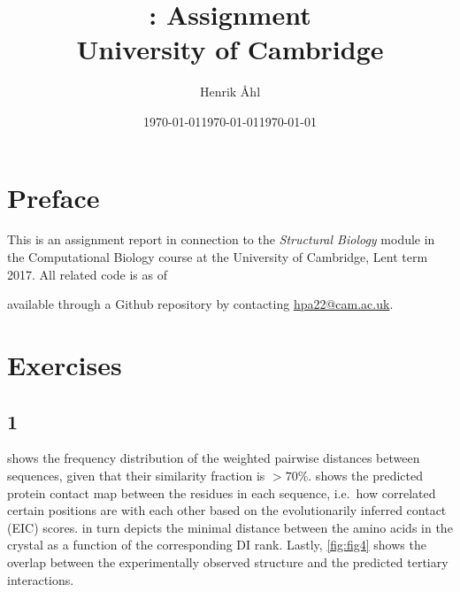 \documentclass[10pt]{article}\usepackage[]{graphicx}\usepackage[]{color}
\title{
  \bf \course: Assignment \ass \\[1em]
  \small{University of Cambridge}
}
\author{Henrik Åhl}
\date{\today}
\theoremstyle{plain}
\newcommand{\course}{Structural Biology}
\newcommand{\term}{Lent term 2017}
\begin{document}
\date{\today}
\maketitle
\setcounter{page}{1}


\maketitle

\begin{multicols*}{2}
\section*{Preface}
This is an assignment report in connection to the \textit{\course}
module in the Computational Biology course at the University of Cambridge,
\term. All related code is as of \date{\today} available through a
Github repository by contacting \href{mailto:hpa22@cam.ac.uk}{hpa22@cam.ac.uk}.

\section*{Exercises}
\subsection*{1}


 shows the frequency distribution of the weighted pairwise distances between sequences, given that their similarity fraction is $> 70 \%$.
 shows the predicted protein contact map between the residues in each sequence, i.e.\ how correlated certain positions are with each other based on the evolutionarily inferred contact (EIC) scores.  in turn depicts the minimal distance between the amino acids in the crystal as a function of the corresponding DI rank. Lastly, \cref{fig:fig4} shows the overlap between the experimentally observed structure and the predicted tertiary interactions.  


\end{multicols*}
\end{document}
